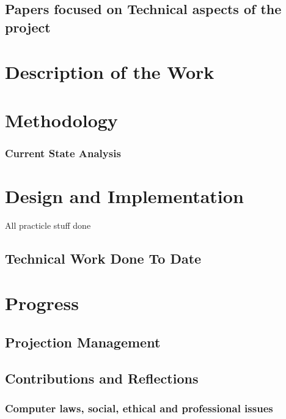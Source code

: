 \documentclass [12pt,letterpaper]{article}
\begin{document}
\subsection{Papers focused on Technical aspects of the project}
\label{sec:technical}

\section{Description of the Work}
\label{sec:work}

\section{Methodology}
\subsubsection{Current State Analysis}
\label{sec:current_state_analysis}
\section{Design and Implementation}
All practicle stuff done
\subsection{Technical Work Done To Date}

\section{Progress}
\subsection{Projection Management}
\subsection{Contributions and Reflections}
\subsubsection{Computer laws, social, ethical and professional issues}
\pagebreak

 
\end{document}
